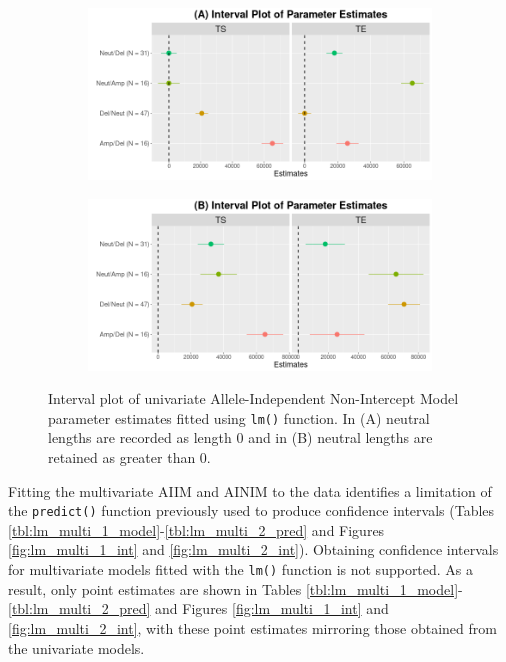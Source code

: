 \begin{figure}[H]
\vspace{0.7cm}
     \begin{subfigure}[t]{.49\textwidth}
      \centering
      \includegraphics[width = 1\textwidth]{../figures/Chapter_5/Univariate_lm_6_AI_Interval.png}
    \end{subfigure}%
     \begin{subfigure}[t]{.49\textwidth}
      \centering
       \includegraphics[width = 1\textwidth]{../figures/Chapter_5/Univariate_lm_6_Neut_AI_Interval.png}
    \end{subfigure} 
     \caption[Interval plot of univariate Allele-Independent Non-Intercept Model parameter estimates fitted using \texttt{lm()} function.]{Interval plot of univariate Allele-Independent Non-Intercept Model parameter estimates fitted using \texttt{lm()} function. In (A) neutral lengths are recorded as length 0 and in (B) neutral lengths are retained as greater than 0.}
     \label{fig:lm_uni_2_int}
\end{figure}
\vfill 

\clearpage

Fitting the multivariate AIIM and AINIM to the data identifies a limitation of the \texttt{predict()} function previously used to produce confidence intervals (Tables \ref{tbl:lm_multi_1_model}-\ref{tbl:lm_multi_2_pred} and Figures \ref{fig:lm_multi_1_int} and \ref{fig:lm_multi_2_int}). Obtaining confidence intervals for multivariate models fitted with the \texttt{lm()} function is not supported. As a result, only point estimates are shown in Tables \ref{tbl:lm_multi_1_model}-\ref{tbl:lm_multi_2_pred} and Figures \ref{fig:lm_multi_1_int} and \ref{fig:lm_multi_2_int}, with these point estimates mirroring those obtained from the univariate models.  

